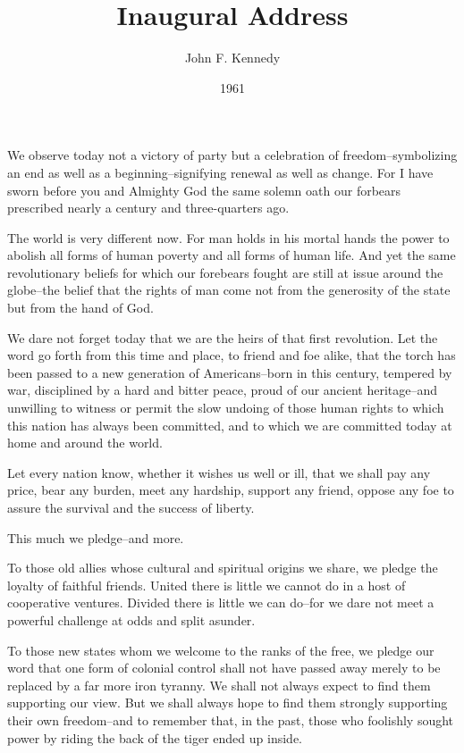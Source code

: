 \documentclass[10pt,a4paper]{article}
\begin{document}
\title{Inaugural Address}
\date{1961}
\author{John F. Kennedy}
\maketitle
    
\thispagestyle{plain}
\setcounter{page}{1}
\linenumbers
\noindent We observe today not a victory of party but a celebration of freedom--symbolizing an end as well as a beginning--signifying renewal as well as change. For I have sworn before you and Almighty God the same solemn oath our forbears prescribed nearly a century and three-quarters ago.

The world is very different now. For man holds in his mortal hands the power to abolish all forms of human poverty and all forms of human life. And yet the same revolutionary beliefs for which our forebears fought are still at issue around the globe--the belief that the rights of man come not from the generosity of the state but from the hand of God.

We dare not forget today that we are the heirs of that first revolution. Let the word go forth from this time and place, to friend and foe alike, that the torch has been passed to a new generation of Americans--born in this century, tempered by war, disciplined by a hard and bitter peace, proud of our ancient heritage--and unwilling to witness or permit the slow undoing of those human rights to which this nation has always been committed, and to which we are committed today at home and around the world.

Let every nation know, whether it wishes us well or ill, that we shall pay any price, bear any burden, meet any hardship, support any friend, oppose any foe to assure the survival and the success of liberty.

This much we pledge--and more.

To those old allies whose cultural and spiritual origins we share, we pledge the loyalty of faithful friends. United there is little we cannot do in a host of cooperative ventures. Divided there is little we can do--for we dare not meet a powerful challenge at odds and split asunder.

To those new states whom we welcome to the ranks of the free, we pledge our word that one form of colonial control shall not have passed away merely to be replaced by a far more iron tyranny. We shall not always expect to find them supporting our view. But we shall always hope to find them strongly supporting their own freedom--and to remember that, in the past, those who foolishly sought power by riding the back of the tiger ended up inside.
\end{document}
